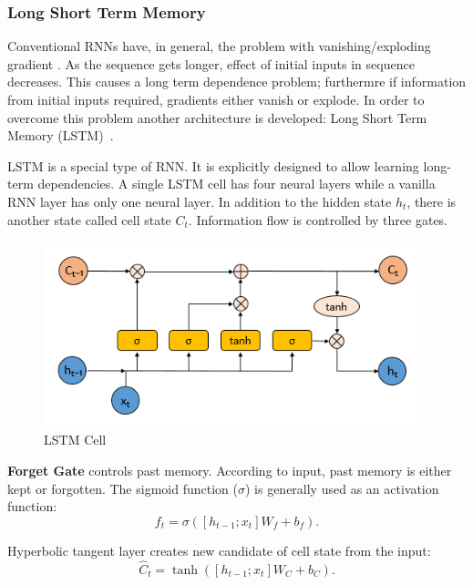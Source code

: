 \subsubsection{Long Short Term Memory}

Conventional RNNs have, in general, the problem with vanishing/exploding gradient \cite{olah_understanding_2015}. 
As the sequence gets longer, effect of initial inputs in sequence decreases. 
This causes a long term dependence problem; furthermre if information from initial inputs required, gradients either vanish or explode. 
In order to overcome this problem another architecture is developed: Long Short Term Memory (LSTM)~\cite{hochreiter_long_1997}. 

LSTM is a special type of RNN. 
It is explicitly designed to allow learning long-term dependencies. 
A single LSTM cell has four neural layers while a vanilla RNN layer has only one neural layer. 
In addition to the hidden state $h_t$, there is another state called cell state $C_t$. 
Information flow is controlled by three gates. 

\begin{figure}
	\centering
	\includegraphics[width=0.98\textwidth]{figures/ml_theory/lstm_cell.png}
	\caption{LSTM Cell~\cite{olah_understanding_2015}}
	\label{fig:lstm_cell}
\end{figure}

\textbf{Forget Gate} controls past memory. 
According to input, past memory is either kept or forgotten. 
The sigmoid function ($\sigma$) is generally used as an activation function: 
\begin{equation}
\label{eqn:lstm_forget}
f_t = \sigma( [h_{t-1}; x_t] W_f + b_f).
\end{equation}

Hyperbolic tangent layer creates new candidate of cell state from the input:  
\begin{equation}
\label{eqn:lstm_cellstcand}
\hat{C}_t = \tanh( [h_{t-1}; x_t] W_C + b_C).
\end{equation}

